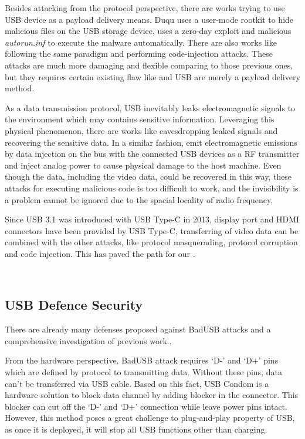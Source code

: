 Besides attacking from the protocol perspective, there are works trying to use USB device as a payload delivery means. Duqu\cite{duqu} uses a user-mode rootkit to hide malicious files on the USB storage device, \cite{flame} uses a zero-day exploit and malicious \textit{autorun.inf} to execute the malware automatically. There are also works like \cite{brain, stuxnet, conficker} following the same paradigm and performing code-injection attacks. These attacks are much more damaging and flexible comparing to those previous ones, but they requires certain existing flaw like \cite{zero-day} and USB are merely a payload delivery method.

As a data transmission protocol, USB inevitably leaks electromagnetic signals to the environment which may contains sensitive information. Leveraging this physical phenomenon, there are works like \cite{smartphone, poweremi,revealing,su2017usb, usbgpslocator, bates2014leveraging, badusbhub, usbfinger, side, usbdriver} eavesdropping leaked signals and recovering the sensitive data. In a similar fashion, \cite{usbee, turnip} emit electromagnetic emissions by data injection on the bus with the connected USB devices as a RF transmitter and \cite{usbkiller, cable} inject analog power to cause physical damage to the host machine. Even though the data, including the video data, could be recovered in this way, these attacks for executing malicious code is too difficult to work, and the invisibility is a problem cannot be ignored due to the spacial locality of radio frequency. 

Since USB 3.1 was introduced with USB Type-C in 2013, display port and HDMI connectors have been provided by USB Type-C, transferring of video data can be combined with the other attacks, like protocol masquerading,  protocol corruption and code injection. This has paved the path for our \tool.




\\


\subsection{USB Defence Security}
\label{subsec:usb_defence}
There are already many defenses proposed against BadUSB attacks and a comprehensive investigation of previous work.\cite{sok}.

From the hardware perspective, BadUSB attack requires `D-' and `D+' pins which are defined by protocol to transmitting data.
Without these pins, data can't be transferred via USB cable. Based on this fact, USB Condom \cite{Condom} is a hardware solution to block data channel by adding blocker in the connector. This blocker can cut off the `D-' and `D+' connection while leave power pins intact.
However, this method poses a great challenge to plug-and-play property of USB, as once it is deployed, it will stop all USB functions other than charging. 

